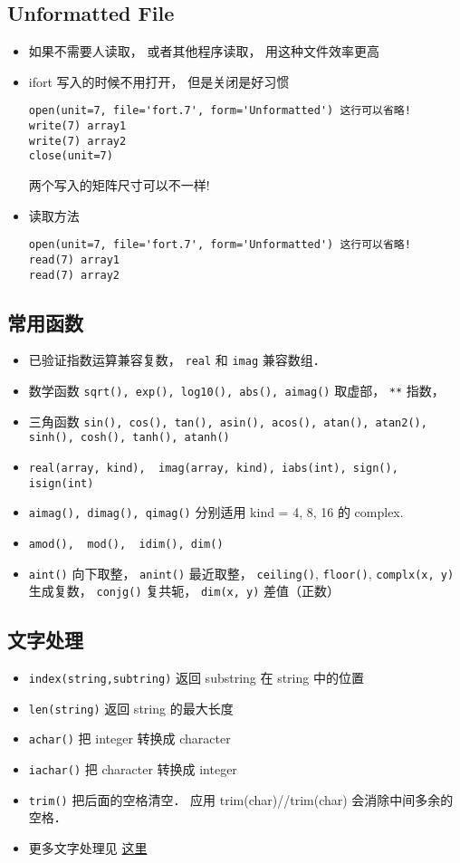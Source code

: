 \subsection{Unformatted File}
\begin{itemize}
\item 如果不需要人读取， 或者其他程序读取， 用这种文件效率更高
\item ifort 写入的时候不用打开， 但是关闭是好习惯
\begin{lstlisting}
open(unit=7, file='fort.7', form='Unformatted') 这行可以省略!
write(7) array1
write(7) array2
close(unit=7)
\end{lstlisting}
两个写入的矩阵尺寸可以不一样!

\item 读取方法
\begin{lstlisting}
open(unit=7, file='fort.7', form='Unformatted') 这行可以省略!
read(7) array1
read(7) array2
\end{lstlisting}
\end{itemize}

\subsection{常用函数}
\begin{itemize}
\item 已验证指数运算兼容复数， \verb`real` 和 \verb`imag` 兼容数组．
\item 数学函数 \verb`sqrt(), exp(), log10(), abs(), aimag()` 取虚部， \verb`**` 指数， 
\item 三角函数 \verb`sin(), cos(), tan(), asin(), acos(), atan(), atan2(), sinh(), cosh(), tanh(), atanh()`
\item \verb`real(array, kind),  imag(array, kind), iabs(int), sign(), isign(int)`
\item \verb`aimag(), dimag(), qimag()` 分别适用 kind = 4, 8, 16 的 complex.
\item \verb`amod(),  mod(),  idim(), dim()`
\item \verb`aint()` 向下取整， \verb`anint()` 最近取整， \verb`ceiling()`, \verb`floor()`, \verb`complx(x, y)` 生成复数， \verb`conjg()` 复共轭， \verb`dim(x, y)` 差值（正数）
\end{itemize}

\subsection{文字处理}
\begin{itemize}
\item \verb`index(string,subtring)` 返回 substring 在 string 中的位置
\item \verb`len(string)` 返回 string 的最大长度
\item \verb`achar()` 把 integer 转换成 character
\item \verb`iachar()` 把 character 转换成 integer
\item \verb`trim()` 把后面的空格清空． 应用  trim(char)//trim(char) 会消除中间多余的空格．
\item 更多文字处理见 \href{http://www.tutorialspoint.com/fortran/fortran_characters.htm}{这里}
\end{itemize}

